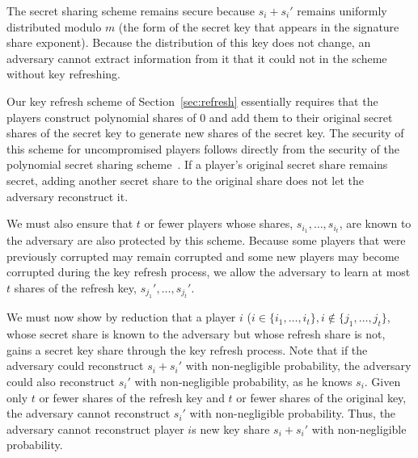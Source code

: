 {The secret sharing scheme remains secure because $s_i+s_i'$ remains
uniformly distributed modulo $m$ (the form of the secret key that
appears in the signature share exponent). Because the distribution of
this key does not change, an adversary cannot extract information from
it that it could not in the scheme without key refreshing.
}


Our key refresh scheme of Section~\ref{sec:refresh} essentially
requires that the players construct polynomial shares of $0$ and add
them to their original secret shares of the secret key to generate new
shares of the secret key. The security of this scheme for
uncompromised players follows directly from the security of the
polynomial secret sharing scheme~\cite{shamirshare}. If a player's
original secret share remains secret, adding another secret share to
the original share does not let the adversary reconstruct it.

We must also ensure that $t$ or fewer players whose shares,
$s_{i_1},\dots,s_{i_t}$, are known to the adversary are also protected
by this scheme. Because some players that were previously corrupted
may remain corrupted and some new players may become corrupted during
the key refresh process, we allow the adversary to learn at most $t$
shares of the refresh key, $s_{j_1}',\dots, s_{j_t}'$.

We must now show by reduction that a player $i$ ($i \in
\{i_1,\dots,i_t\}, i\not\in \{j_1,\dots,j_t\}$, whose secret share is
known to the adversary but whose refresh share is not, gains a secret
key share through the key refresh process. Note that if the adversary
could reconstruct $s_i+s_i'$ with non-negligible probability, the
adversary could also reconstruct $s_i'$ with non-negligible
probability, as he knows $s_i$. Given only $t$ or fewer shares of the
refresh key and $t$ or fewer shares of the original key, the adversary
cannot reconstruct $s_i'$ with non-negligible probability. Thus, the
adversary cannot reconstruct player $i$s new key share $s_i+s_i'$ with
non-negligible probability.
